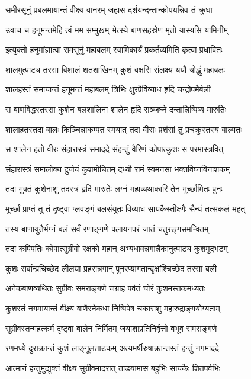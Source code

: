 \twolineshloka
{समीरसूनुं प्रबलमायान्तं वीक्ष्य वानरम्}
{जहास दर्शयन्दन्तान्कोपयन्निव तं क्रुधा}%

\twolineshloka
{उवाच च हनूमन्तमेहि त्वं मम सम्मुखम्}
{भेत्स्ये बाणसहस्रेण मृतो यास्यसि यामिनीम्}%

\twolineshloka
{इत्युक्तो हनुमांज्ञात्वा रामसूनुं महाबलम्}
{स्वामिकार्यं प्रकर्तव्यमिति कृत्वा प्रधावितः}%

\twolineshloka
{शालमुत्पाट्य तरसा विशालं शतशाखिनम्}
{कुशं वक्षसि संलक्ष्य ययौ योद्धुं महाबलः}%

\twolineshloka
{शालहस्तं समायान्तं हनूमन्तं महाबलम्}
{त्रिभिः क्षुरप्रैर्विव्याध हृदि चन्द्रोपमैर्बली}%

\twolineshloka
{स बाणविद्धस्तरसा कुशेन बलशालिना}
{शालेन हृदि सञ्जघ्ने दन्तान्निष्पिष्य मारुतिः}%

\twolineshloka
{शालाहतस्तदा बालः किञ्चिन्नाकम्पत स्मयात्}
{तदा वीराः प्रशंसां तु प्रचक्रुस्तस्य बाल्यतः}%

\twolineshloka
{स शालेन हतो वीरः संहारास्त्रं समाददे}
{संहन्तुं वैरिणं कोपात्कुशः स परमास्त्रवित्}%

\twolineshloka
{संहारास्त्रं समालोक्य दुर्जयं कुशमोचितम्}
{दध्यौ रामं स्वमनसा भक्तविघ्नविनाशकम्}%

\twolineshloka
{तदा मुक्तं कुशेनाशु तदस्त्रं हृदि मारुतेः}
{लग्नं महाव्यथाकारि तेन मूर्च्छामितः पुनः}%

\twolineshloka
{मूर्च्छां प्राप्तं तु तं दृष्ट्वा प्लवङ्गं बलसंयुतः}
{विव्याध सायकैस्तीक्ष्णैः सैन्यं तत्सकलं महत्}%

\twolineshloka
{तस्य बाणायुतैर्भग्नं बलं सर्वं रणाङ्गणे}
{पलायनपरं जातं चतुरङ्गसमन्वितम्}%

\twolineshloka
{तदा कपिपतिः कोपात्सुग्रीवो रक्षको महान्}
{अभ्यधावन्नगान्नैकानुत्पाट्य कुशमुद्भटम्}%

\twolineshloka
{कुशः सर्वान्प्रचिच्छेद लीलया प्रहसन्नगान्}
{पुनरप्यागतान्वृक्षांश्चिच्छेद तरसा बली}%

\twolineshloka
{अनेकबाणव्यथितः सुग्रीवः समराङ्गणे}
{जग्राह पर्वतं घोरं कुशमस्तकमध्यतः}%

\twolineshloka
{कुशस्तं नगमायान्तं वीक्ष्य बाणैरनेकधा}
{निष्पिपेष चकाराशु महारुद्राङ्गयोग्यताम्}%

\twolineshloka
{सुग्रीवस्तन्महत्कर्म दृष्ट्वा बालेन निर्मितम्}
{जयाशाप्रतिनिर्वृत्तो बभूव समराङ्गणे}%

\twolineshloka
{रणमध्ये दुराक्रान्तं कुशं लाङ्गूलताडकम्}
{अत्यमर्षीरुषाक्रान्तस्तं हन्तुं नगमाददे}%

\twolineshloka
{आत्मानं हन्तुमुद्युक्तं वीक्ष्य सुग्रीवमादरात्}
{ताडयामास बहुभिः सायकैः शितपर्वभिः}%

